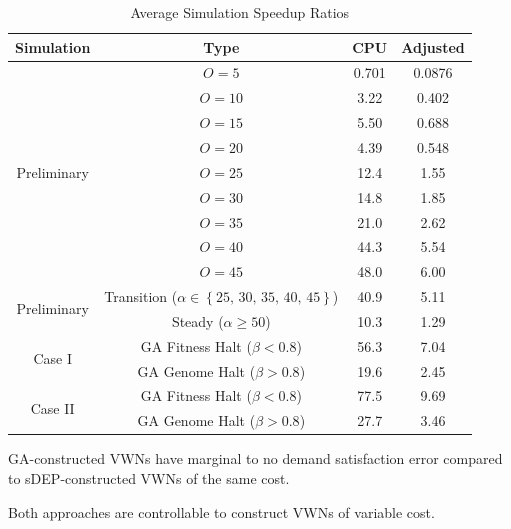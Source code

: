 \documentclass[12pt,dvipsnames]{report}
\begin{document}
\begin{table}[ht]
	\centering
	\caption{Average Simulation Speedup Ratios}
	\begin{tabular}{|c|c|c|c|} 
		\hline
		\textbf{Simulation} & \textbf{Type} & \textbf{CPU} & \textbf{Adjusted} \\
		\hline
		\multirow{9}{*}{Preliminary} & $O=5$ & 0.701 & 0.0876 \\
		& $O=10$ & 3.22 & 0.402 \\
		& $O=15$ & 5.50 & 0.688 \\
		& $O=20$ & 4.39 & 0.548 \\
		& $O=25$ & 12.4 & 1.55 \\
		& $O=30$ & 14.8 & 1.85 \\
		& $O=35$ & 21.0 & 2.62 \\
		& $O=40$ & 44.3 & 5.54 \\
		& $O=45$ & 48.0 & 6.00 \\
		\hline
		\multirow{2}{*}{Preliminary} & Transition ($\alpha \in \left\{ 25,\, 30,\, 35,\, 40,\, 45 \right\}$) & 40.9 & 5.11 \\
		& Steady ($\alpha \geq 50$) & 10.3 & 1.29 \\
		\hline
		\multirow{2}{*}{Case I} & GA Fitness Halt ($\beta < 0.8$) & 56.3 & 7.04 \\
		& GA Genome Halt ($\beta > 0.8$) & 19.6 & 2.45 \\
		\hline
		\multirow{2}{*}{Case II} & GA Fitness Halt ($\beta < 0.8$) & 77.5 & 9.69 \\
		& GA Genome Halt ($\beta > 0.8$) & 27.7 & 3.46 \\
		\hline
	\end{tabular}
	\label{tab:VWNConstructionRunTimes}
\end{table}

GA-constructed VWNs have marginal to no demand satisfaction error compared to sDEP-constructed VWNs of the same cost.

Both approaches are controllable to construct VWNs of variable cost.

\end{document}
